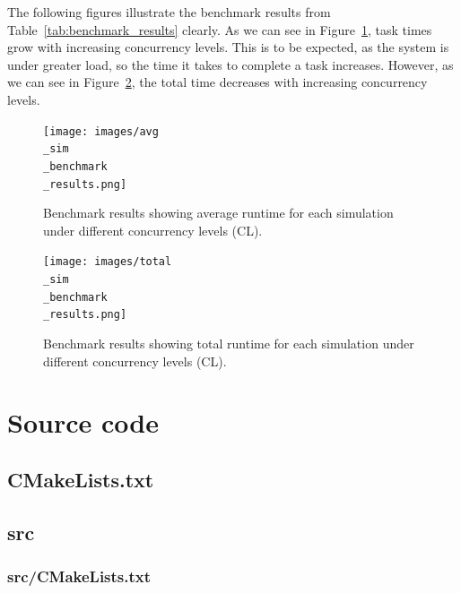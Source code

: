 The following figures illustrate the benchmark results from Table~\ref{tab:benchmark_results} clearly.
As we can see in Figure~\ref{fig:avg_sim_benchmark_results}, task times grow with increasing concurrency levels.
This is to be expected, as the system is under greater load, so the time it takes to complete a task increases.
However, as we can see in Figure~\ref{fig:total_sim_benchmark_results}, the total time decreases with increasing concurrency levels.

\begin{figure}[H]
\centering
\texttt{[image: images/avg\\\_sim\\\_benchmark\\\_results.png]}
\caption{Benchmark results showing average runtime for each simulation under different concurrency levels (CL).}
\label{fig:avg_sim_benchmark_results}
\end{figure}

\begin{figure}[H]
\centering
\texttt{[image: images/total\\\_sim\\\_benchmark\\\_results.png]}
\caption{Benchmark results showing total runtime for each simulation under different concurrency levels (CL).}
\label{fig:total_sim_benchmark_results}
\end{figure}



\newpage

\section{Source code}
\subsection{CMakeLists.txt}


\newpage
\subsection{src}
\subsubsection{src/CMakeLists.txt}

\newpage
